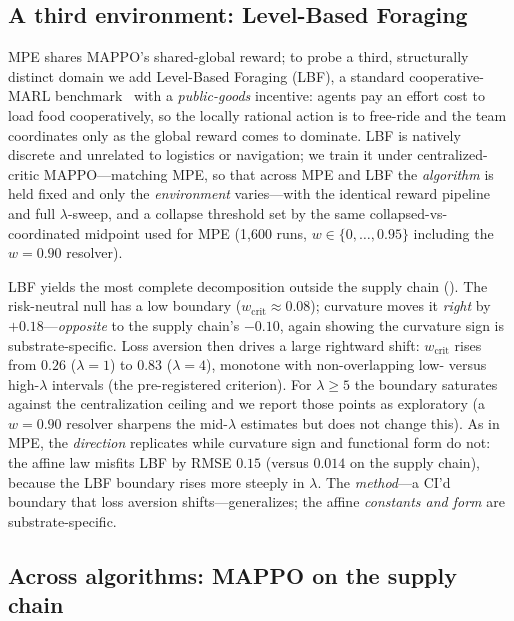 \documentclass[letterpaper]{article}
\theoremstyle{plain}
\newcommand{\wcrit}{w_{\mathrm{crit}}}
\begin{document}
\subsection{A third environment: Level-Based Foraging}
\label{sec:lbf}
MPE shares MAPPO's shared-global reward; to probe a third, structurally distinct
domain we add Level-Based Foraging (LBF), a standard cooperative-MARL
benchmark~\citep{christianos2020shared} with a \emph{public-goods} incentive:
agents pay an effort cost to load food cooperatively, so the locally rational
action is to free-ride and the team coordinates only as the global reward comes
to dominate. LBF is natively discrete and unrelated to logistics or navigation;
we train it under centralized-critic MAPPO---matching MPE, so that across MPE and
LBF the \emph{algorithm} is held fixed and only the \emph{environment}
varies---with the identical reward pipeline and full $\lambda$-sweep, and a
collapse threshold set by the same collapsed-vs-coordinated midpoint used for MPE
(1{,}600 runs, $w\in\{0,\ldots,0.95\}$ including the $w{=}0.90$ resolver).

LBF yields the most complete decomposition outside the supply chain
(). The risk-neutral null has a low boundary
($\wcrit\approx0.08$); curvature moves it \emph{right} by $+0.18$---\emph{opposite}
to the supply chain's $-0.10$, again showing the curvature sign is
substrate-specific. Loss aversion then drives a large rightward shift: $\wcrit$
rises from $0.26$ ($\lambda{=}1$) to $0.83$ ($\lambda{=}4$), monotone with
non-overlapping low- versus high-$\lambda$ intervals (the pre-registered
criterion). For $\lambda{\geq}5$ the boundary saturates against the centralization
ceiling and we report those points as exploratory (a $w{=}0.90$ resolver sharpens
the mid-$\lambda$ estimates but does not change this). As in MPE, the
\emph{direction} replicates while curvature sign and functional form do not: the
affine law misfits LBF by RMSE $0.15$ (versus $0.014$ on the supply chain),
because the LBF boundary rises more steeply in $\lambda$. The \emph{method}---a
CI'd boundary that loss aversion shifts---generalizes; the affine \emph{constants
and form} are substrate-specific.

\subsection{Across algorithms: MAPPO on the supply chain}
\label{sec:appendix_crossalgo}
\end{document}

